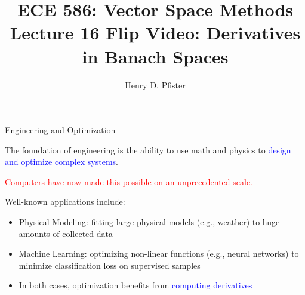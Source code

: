 \documentclass[10pt,english,aspectratio=169]{beamer}
\begin{document}
\title{ECE 586: Vector Space Methods \\ Lecture 16 Flip Video: Derivatives in Banach Spaces}
\author{Henry D. Pfister \\ \univ}
\date{}


\begin{frame}[plain]
	\titlepage
	
\end{frame}

\addtocounter{framenumber}{-1}



\begin{frame}{Engineering and Optimization}

The foundation of engineering is the ability to use math and physics to \textcolor{blue}{design and optimize complex systems}.

\vspace{4mm}

\textcolor{red}{Computers have now made this possible on an unprecedented scale.}

\vspace{4mm}

Well-known applications include: \vspace{1mm}
\begin{itemize}
\setlength\itemsep{3mm}
\item<1-> Physical Modeling: fitting large physical models (e.g., weather) to huge amounts of collected data

\item<2-> Machine Learning: optimizing non-linear functions (e.g., neural networks) to minimize classification loss on supervised samples

\item<3-> In both cases, optimization benefits from \textcolor{blue}{computing derivatives}

\end{itemize}
\end{frame}
\end{document}
